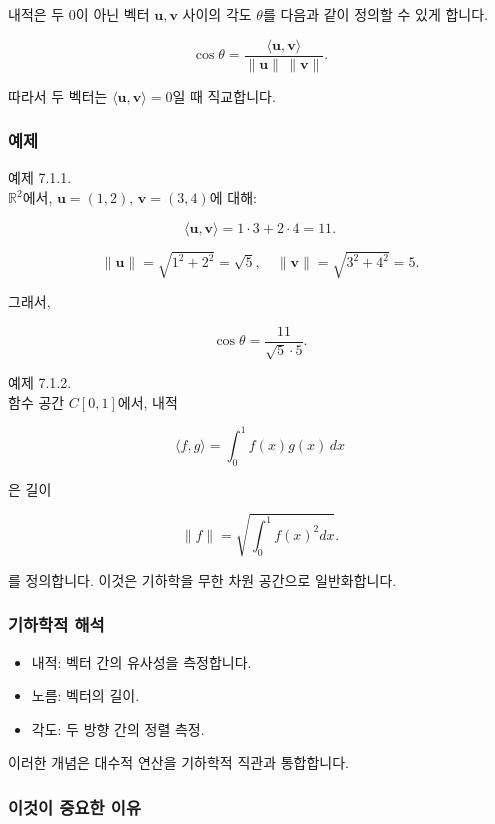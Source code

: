 \documentclass[
  12pt,
  a4paper,
]{article}
\begin{document}
내적은 두 0이 아닌 벡터 \(\mathbf{u}, \mathbf{v}\) 사이의 각도 \(\theta\)를 다음과 같이 정의할 수 있게 합니다.

\[\cos \theta = \frac{\langle \mathbf{u}, \mathbf{v} \rangle}{\|\mathbf{u}\| \, \|\mathbf{v}\|}.\]

따라서 두 벡터는 \(\langle \mathbf{u}, \mathbf{v} \rangle = 0\)일 때 직교합니다.

\subsubsection{예제}\label{examples-6}

예제 7.1.1.\\
\(\mathbb{R}^2\)에서, \(\mathbf{u} = (1,2)\), \(\mathbf{v} = (3,4)\)에 대해:

\[\langle \mathbf{u}, \mathbf{v} \rangle = 1\cdot 3 + 2\cdot 4 = 11.\]

\[\|\mathbf{u}\| = \sqrt{1^2 + 2^2} = \sqrt{5}, \quad \|\mathbf{v}\| = \sqrt{3^2 + 4^2} = 5.\]

그래서,

\[\cos \theta = \frac{11}{\sqrt{5}\cdot 5}.\]

예제 7.1.2.\\
함수 공간 \(C[0,1]\)에서, 내적

\[\langle f, g \rangle = \int_0^1 f(x) g(x)\, dx\]

은 길이

\[\|f\| = \sqrt{\int_0^1 f(x)^2 dx}.\]

를 정의합니다. 이것은 기하학을 무한 차원 공간으로 일반화합니다.

\subsubsection{기하학적 해석}\label{geometric-interpretation-13}

\begin{itemize}
\item
  내적: 벡터 간의 유사성을 측정합니다.
\item
  노름: 벡터의 길이.
\item
  각도: 두 방향 간의 정렬 측정.
\end{itemize}

이러한 개념은 대수적 연산을 기하학적 직관과 통합합니다.

\subsubsection{이것이 중요한 이유}\label{why-this-matters-24}
\end{document}

